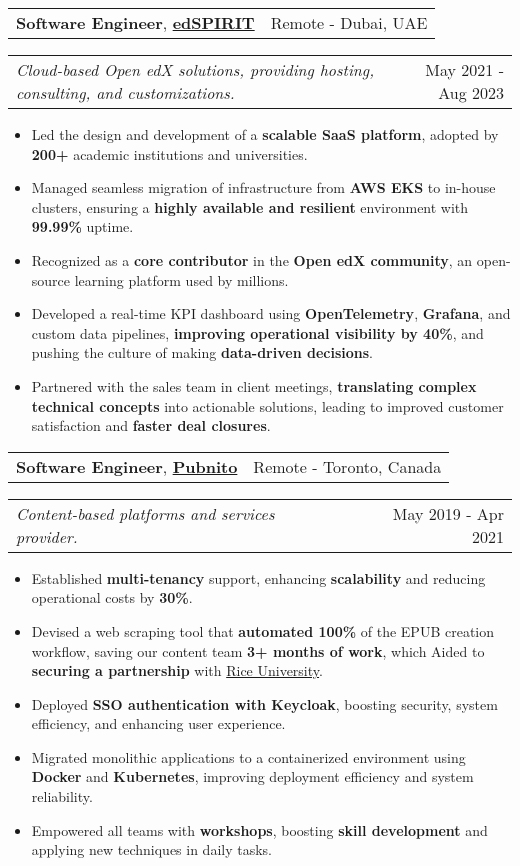 \documentclass[letterpaper,11pt]{article}
\makeatletter
\newcommand{\resumeItemSimple}[1]{
  \item\small{
    {#1}
  }
}
\newcommand{\resumeSubheadingSimple}[5]{
    \begin{tabular*}{1\textwidth}[t]{l@{\extracolsep{\fill}}r}
      \textbf{#1}, \textbf{\href{#3}{#2}} \space \small#4 & \small#5 \\
    \end{tabular*}
}
\newcommand{\resumeSubSubheading}[2]{
    \begin{tabular*}{1\textwidth}{l@{\extracolsep{\fill}}r}
      \textit{\small#1} & \small #2 \\
    \end{tabular*}\vspace{-1pt}
}
\newcommand{\resumeItemListStart}{\begin{itemize}[leftmargin=0.5cm, itemsep=1pt, parsep=0pt]} %
\newcommand{\resumeItemListEnd}{\end{itemize}}
\makeatother
\begin{document}
  \resumeSubheadingSimple
    {Software Engineer}{edSPIRIT}{https://www.linkedin.com/company/edspirit-tech/}{}{Remote - Dubai, UAE}
    \resumeSubSubheading{Cloud-based Open edX solutions, providing hosting, consulting, and customizations.}{May 2021 - Aug 2023}
    \resumeItemListStart
      \resumeItemSimple{Led the design and development of a \textbf{scalable SaaS platform}, adopted by \textbf{200+} academic institutions and universities.}
      \resumeItemSimple{Managed seamless migration of infrastructure from \textbf{AWS EKS} to in-house clusters, ensuring a \textbf{highly available and resilient} environment with \textbf{99.99\%} uptime.}
      \resumeItemSimple{Recognized as a \textbf{core contributor} in the \textbf{Open edX community}, an open-source learning platform used by millions.}
      \resumeItemSimple{Developed a real-time KPI dashboard using \textbf{OpenTelemetry}, \textbf{Grafana}, and custom data pipelines, \textbf{improving operational visibility by 40\%}, and pushing the culture of making \textbf{data-driven decisions}.}
      \resumeItemSimple{Partnered with the sales team in client meetings, \textbf{translating complex technical concepts} into actionable solutions, leading to improved customer satisfaction and \textbf{faster deal closures}.}
    \resumeItemListEnd

  \resumeSubheadingSimple
    {Software Engineer}{Pubnito}{https://www.linkedin.com/company/pubnito/}{}{Remote - Toronto, Canada}
    \resumeSubSubheading{Content-based platforms and services provider.}{May 2019 - Apr 2021}
    \resumeItemListStart
      \resumeItemSimple{Established \textbf{multi-tenancy} support, enhancing \textbf{scalability} and reducing operational costs by \textbf{30\%}.}
      \resumeItemSimple{Devised a web scraping tool that \textbf{automated 100\%} of the EPUB creation workflow, saving our content team \textbf{3+ months of work}, which Aided to \textbf{securing a partnership} with \href{https://www.rice.edu/}{Rice University}.}
      \resumeItemSimple{Deployed \textbf{SSO authentication with Keycloak}, boosting security, system efficiency, and enhancing user experience.}
      \resumeItemSimple{Migrated monolithic applications to a containerized environment using \textbf{Docker} and \textbf{Kubernetes}, improving deployment efficiency and system reliability.}
      \resumeItemSimple{Empowered all teams with \textbf{workshops}, boosting \textbf{skill development} and applying new techniques in daily tasks.}
    \resumeItemListEnd
\end{document}
